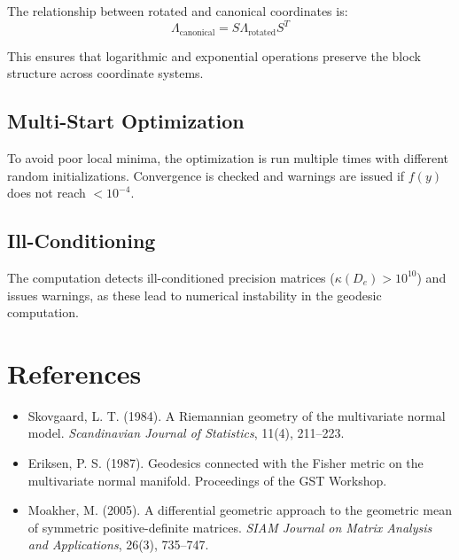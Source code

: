 \documentclass{article}
\begin{document}
The relationship between rotated and canonical coordinates is:
\[
\Lambda_{\text{canonical}} = S \Lambda_{\text{rotated}} S^T
\]

This ensures that logarithmic and exponential operations preserve the block structure across coordinate systems.

\subsection{Multi-Start Optimization}

To avoid poor local minima, the optimization is run multiple times with different random initializations. Convergence is checked and warnings are issued if $f(y)$ does not reach $< 10^{-4}$.

\subsection{Ill-Conditioning}

The computation detects ill-conditioned precision matrices ($\kappa(D_e) > 10^{10}$) and issues warnings, as these lead to numerical instability in the geodesic computation.

\section{References}

\begin{itemize}
  \item Skovgaard, L. T. (1984). A Riemannian geometry of the multivariate normal model. \textit{Scandinavian Journal of Statistics}, 11(4), 211--223.
  
  \item Eriksen, P. S. (1987). Geodesics connected with the Fisher metric on the multivariate normal manifold. Proceedings of the GST Workshop.
  
  \item Moakher, M. (2005). A differential geometric approach to the geometric mean of symmetric positive-definite matrices. \textit{SIAM Journal on Matrix Analysis and Applications}, 26(3), 735--747.
\end{itemize}
\end{document}
